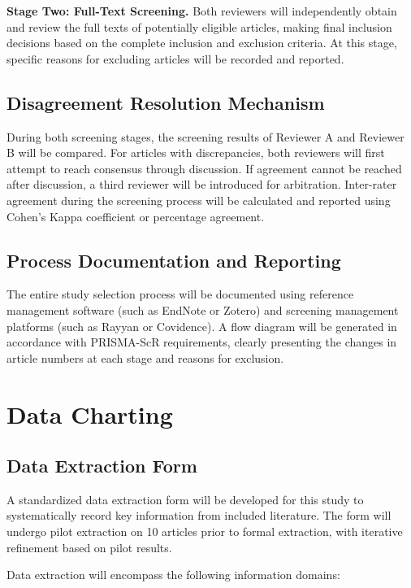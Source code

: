 \documentclass[12pt,a4paper]{article}
\begin{document}
\textbf{Stage Two: Full-Text Screening.} Both reviewers will independently obtain and review the full texts of potentially eligible articles, making final inclusion decisions based on the complete inclusion and exclusion criteria. At this stage, specific reasons for excluding articles will be recorded and reported.

\subsection{Disagreement Resolution Mechanism}

During both screening stages, the screening results of Reviewer A and Reviewer B will be compared. For articles with discrepancies, both reviewers will first attempt to reach consensus through discussion. If agreement cannot be reached after discussion, a third reviewer will be introduced for arbitration. Inter-rater agreement during the screening process will be calculated and reported using Cohen's Kappa coefficient or percentage agreement.

\subsection{Process Documentation and Reporting}

The entire study selection process will be documented using reference management software (such as EndNote or Zotero) and screening management platforms (such as Rayyan or Covidence). A flow diagram will be generated in accordance with PRISMA-ScR requirements, clearly presenting the changes in article numbers at each stage and reasons for exclusion.

\section{Data Charting}

\subsection{Data Extraction Form}

A standardized data extraction form will be developed for this study to systematically record key information from included literature. The form will undergo pilot extraction on 10 articles prior to formal extraction, with iterative refinement based on pilot results.

Data extraction will encompass the following information domains:
\end{document}
